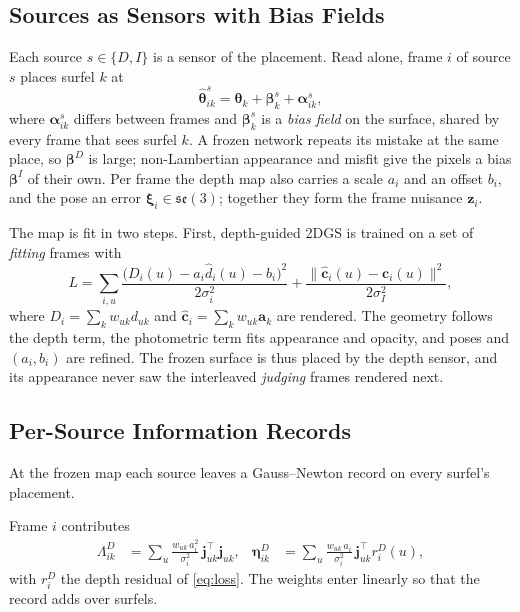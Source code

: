 \subsection{Sources as Sensors with Bias Fields}
\label{sec:method:sensors}
Each source $s\in\{D,I\}$ is a sensor of the placement. Read alone, frame $i$ of source $s$ places surfel
$k$ at
\begin{equation}
\hat{\boldsymbol\theta}^{s}_{ik}=\boldsymbol\theta_k+\boldsymbol\beta^{s}_k+\boldsymbol\alpha^{s}_{ik},
\label{eq:sensor}
\end{equation}
where $\boldsymbol\alpha^{s}_{ik}$ differs between frames and $\boldsymbol\beta^{s}_k$ is a \emph{bias
field} on the surface, shared by every frame that sees surfel $k$. A frozen network repeats its mistake at the same
place, so $\boldsymbol\beta^{D}$ is large; non-Lambertian appearance and misfit give the pixels a bias
$\boldsymbol\beta^{I}$ of their own. Per frame the depth map also carries a scale $a_i$ and an offset $b_i$, and the pose an error
$\boldsymbol\xi_i\in\mathfrak{se}(3)$; together they form the frame nuisance $\mathbf z_i$.

The map is fit in two steps. First, depth-guided 2DGS is trained on a set of \emph{fitting} frames with
\begin{equation}
L=\sum_{i,u}\frac{\bigl(D_i(u)-a_i\hat d_i(u)-b_i\bigr)^2}{2\sigma_i^{2}}
+\frac{\lVert\hat{\mathbf c}_i(u)-\mathbf c_i(u)\rVert^2}{2\sigma_I^{2}},
\label{eq:loss}
\end{equation}
where $D_i=\sum_k w_{uk}d_{uk}$ and $\hat{\mathbf c}_i=\sum_k w_{uk}\mathbf a_k$ are rendered. The
geometry follows the depth term, the photometric term fits appearance and opacity, and poses and
$(a_i,b_i)$ are refined. The frozen surface is thus placed by the depth sensor, and its appearance never
saw the interleaved \emph{judging} frames rendered next.

\subsection{Per-Source Information Records}
\label{sec:method:records}
At the frozen map each source leaves a Gauss--Newton record on every surfel's placement.

 Frame $i$ contributes
\begin{align}
\Lambda^{D}_{ik}&=\sum_{u}\frac{w_{uk}\,a_i^{2}}{\sigma_i^{2}}\,\mathbf j_{uk}^{\top}\mathbf j_{uk},&
\boldsymbol\eta^{D}_{ik}&=\sum_{u}\frac{w_{uk}\,a_i}{\sigma_i^{2}}\,\mathbf j_{uk}^{\top}r^{D}_i(u),
\label{eq:depthrecord}
\end{align}
with $r^{D}_i$ the depth residual of \eqref{eq:loss}. The weights enter linearly so that the record adds
over surfels.

